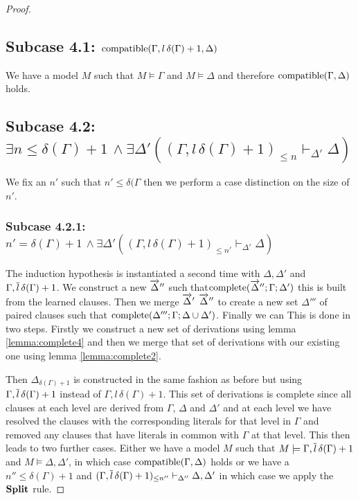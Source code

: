 \begin{mytheorem}
\begin{proof}
\subsection*{Subcase 4.1: $\mathrm{compatible}(\Gamma, l \, \delta(\Gamma) + 1,\Delta)$}
We have a model $M$ such that $M \models \Gamma$ and $M \models \Delta$ and therefore $\mathrm{compatible}(\Gamma,\Delta)$ holds.
%
\subsection*{Subcase 4.2: $ \exists n \leq \delta(\Gamma) + 1 \, \wedge  \exists \Delta' ( (\Gamma, l \, \delta(\Gamma) + 1)_{ \leq n}  \vdash_{\Delta'} \Delta)$}
We fix an $n'$ such that $n' \leq \delta(\Gamma$ then we perform a case distinction on the size of $n'$.
%
\subsubsection*{Subcase 4.2.1: $  n' = \delta(\Gamma) + 1 \, \wedge  \exists \Delta' ( (\Gamma, l \, \delta(\Gamma) + 1) _{\leq n'}  \vdash_{\Delta'} \Delta)$}
The induction hypothesis is instantiated a second time with $\Delta, \Delta'$ and $\Gamma, \overline{l} \, \delta(\Gamma) + 1$. 
We construct a new $\overrightarrow{\Delta}''$ such that$\mathrm{complete}(\overrightarrow{\Delta}'';\Gamma; \Delta')$ this is built from the learned clauses. Then we merge $\overrightarrow{\Delta}'$ $\overrightarrow{\Delta}''$ to create a new set $\Delta'''$ of paired clauses such that $\mathrm{complete}(\Delta''';\Gamma; \Delta \cup \Delta')$. Finally we can 
 This is done in two steps. Firstly we construct a new set of derivations using lemma \ref{lemma:complete4} and then we merge that set of derivations with our existing one using lemma \ref{lemma:complete2}.

 Then $\Delta_{\delta(\Gamma) + 1}$ is constructed in the same fashion  as before but using $\Gamma, \overline{l} \, \delta(\Gamma) + 1$  instead of $\Gamma, l \, \delta(\Gamma ) + 1$. This set of derivations is complete since all clauses at each level are derived from $\Gamma$, $\Delta$ and $\Delta'$ and at each level we have resolved the clauses with the corresponding literals for that level in $\Gamma$ and removed any clauses that have literals in common with $\Gamma$ at that level.  This then leads to two further cases. Either we have a model $M$ such that $M \models \Gamma, \overline{l} \, \delta(\Gamma) + 1$ and $M \models \Delta, \Delta'$, in which case $\mathrm{compatible}(\Gamma,\Delta)$ holds or we have a $n'' \leq \delta(\Gamma) + 1$ and $(\Gamma, \overline{l} \, \delta(\Gamma) + 1)_{\leq n''} \vdash_{\Delta''} \Delta, \Delta'$ in which case we apply the $\mathbf{Split}$ rule.
\begin{comment}
\textbf{We need to know that all of the learned clauses in $\Delta'$ are derivable from $\Gamma$ and $\Delta$ otherwise they are useless as the $\Conflict$ could not be applied to them. We know that they can be derived from some $\Gamma$ and $\Delta$ but how do we know that they are derivable from the current $\Gamma$ since it could be the case that backtracking has occured and there is now a smaller $\Gamma$.}
\end{comment}
%

\end{proof}
\end{mytheorem}
